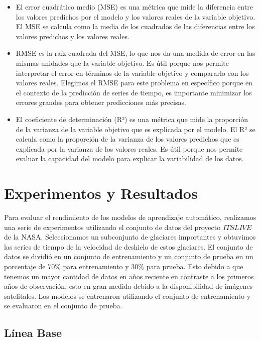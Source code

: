\documentclass[sigconf,authordraft,language=spanish]{acmart}
\begin{document}
\begin{itemize}
  \item El error cuadrático medio (MSE) es una métrica que mide la diferencia entre los valores predichos por el modelo y los valores reales de la variable objetivo.
El MSE se calcula como la media de los cuadrados de las diferencias entre los valores predichos y los valores reales.
  \item RMSE es la raíz cuadrada del MSE, lo que nos da una medida de error en las mismas unidades que la variable objetivo.
  Es útil porque nos permite interpretar el error en términos de la variable objetivo y compararlo con los valores reales.
Elegimos el RMSE para este problema en específico porque en el contexto de la predicción de series de tiempo, es importante minimizar los errores grandes para obtener predicciones más precisas.
  \item El coeficiente de determinación (R²) es una métrica que mide la proporción de la varianza de la variable objetivo que es explicada por el modelo.
El R² se calcula como la proporción de la varianza de los valores predichos que es explicada por la varianza de los valores reales.
Es útil porque nos permite evaluar la capacidad del modelo para explicar la variabilidad de los datos.
\end{itemize}

\section{Experimentos y Resultados}

Para evaluar el rendimiento de los modelos de aprendizaje automático, realizamos una serie de experimentos utilizando el conjunto de datos del proyecto $ITSLIVE$ de la NASA.
Seleccionamos un subconjunto de glaciares importantes y obtuvimos las series de tiempo de la velocidad de deshielo de estos glaciares.
El conjunto de datos se dividió en un conjunto de entrenamiento y un conjunto de prueba en un porcentaje de $70\%$ para entrenamiento y $30\%$ para prueba.
Esto debido a que tenemos un mayor cantidad de datos en años reciente en contraste a los primeros años de observación, esto en gran medida debido a la disponibilidad de imágenes satelitales.  
Los modelos se entrenaron utilizando el conjunto de entrenamiento y se evaluaron en el conjunto de prueba.

\subsection{Línea Base}
\end{document}
